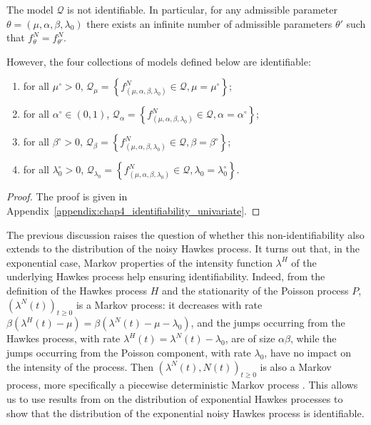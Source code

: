         \begin{proposition}\label{prop:chap4_fixed_univariate_identifiability}
        	The model $\mathcal{Q}$ is not identifiable.
        	In particular, for any admissible parameter $\theta = (\mu, \alpha, \beta, \lambda_0)$ there exists an infinite number of admissible parameters $\theta'$ such that $f_{\theta}^N = f_{\theta'}^N$.
        	
        	However, the four collections of models defined below are identifiable:
          \begin{enumerate}
            \item for all $\mu^\circ > 0$, $\mathcal Q_{\mu} = \left\{ f_{(\mu, \alpha, \beta, \lambda_0)}^N \in \mathcal Q, \mu = \mu^\circ \right\}$;
            \item for all $\alpha^\circ \in (0, 1)$, $\mathcal Q_{\alpha} = \left\{ f_{(\mu, \alpha, \beta, \lambda_0)}^N \in \mathcal Q, \alpha = \alpha^\circ \right\}$;
            \item for all $\beta^\circ > 0$, $\mathcal Q_{\beta} = \left\{ f_{(\mu, \alpha, \beta, \lambda_0)}^N \in \mathcal Q, \beta = \beta^\circ \right\}$;
            \item for all $\lambda_0^\circ > 0$, $\mathcal Q_{\lambda_0} = \left\{ f_{(\mu, \alpha, \beta, \lambda_0)}^N \in \mathcal Q, \lambda_0 = \lambda_0^\circ \right\}$.
          \end{enumerate}
        \end{proposition}
        \begin{proof}
	        The proof is given in Appendix~\ref{appendix:chap4_identifiability_univariate}.
        \end{proof}
        
        The previous discussion raises the question of whether this non-identifiability also extends to the distribution of the noisy Hawkes process.
It turns out that, in the exponential case, Markov properties of the intensity function $\lambda^H$ of the underlying Hawkes process help ensuring identifiability.
Indeed, from the definition of the Hawkes process $H$ and the stationarity of the Poisson process $P$, $\left( \lambda^N(t) \right)_{t \ge 0}$ is a Markov process: it decreases with rate $\beta(\lambda^H(t) - \mu) = \beta (\lambda^N(t) - \mu - \lambda_0)$, and the jumps occurring from the Hawkes process, with rate $\lambda^H(t) = \lambda^N(t) - \lambda_0$, are of size $\alpha \beta$, while the jumps occurring from the Poisson component, with rate $\lambda_0$, have no impact on the intensity of the process. 
Then $\left( \lambda^N(t), N(t) \right)_{t \ge 0}$ is also a Markov process, more specifically a piecewise deterministic Markov process \parencite{Davis1984}.
This allows us to use results from \textcite{Dassios2011} on the distribution of exponential Hawkes processes to show that the distribution of the exponential noisy Hawkes process is identifiable. 

